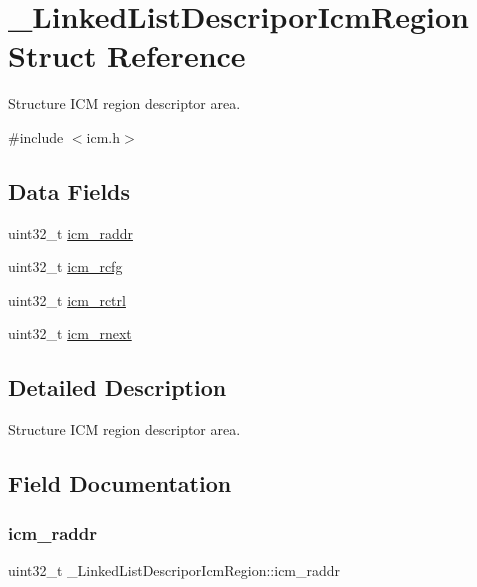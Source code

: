 \hypertarget{struct__LinkedListDescriporIcmRegion}{}\section{\+\_\+\+Linked\+List\+Descripor\+Icm\+Region Struct Reference}
\label{struct__LinkedListDescriporIcmRegion}


Structure I\+CM region descriptor area.  




{\ttfamily \#include $<$icm.\+h$>$}

\subsection*{Data Fields}
\begin{DoxyCompactItemize}
\item 
uint32\+\_\+t \mbox{\hyperlink{struct__LinkedListDescriporIcmRegion_a00caf8a36933079117e008146cad1712}{icm\+\_\+raddr}}
\item 
uint32\+\_\+t \mbox{\hyperlink{struct__LinkedListDescriporIcmRegion_a5b5bcef3f4fd257322d694648096ee69}{icm\+\_\+rcfg}}
\item 
uint32\+\_\+t \mbox{\hyperlink{struct__LinkedListDescriporIcmRegion_a838bcfa002525b1e5f64966faf30dac0}{icm\+\_\+rctrl}}
\item 
uint32\+\_\+t \mbox{\hyperlink{struct__LinkedListDescriporIcmRegion_a91c8e9c36f90b51ab714cc686886ef31}{icm\+\_\+rnext}}
\end{DoxyCompactItemize}


\subsection{Detailed Description}
Structure I\+CM region descriptor area. 

\subsection{Field Documentation}
\mbox{\label{struct__LinkedListDescriporIcmRegion_a00caf8a36933079117e008146cad1712}} 
\subsubsection{\texorpdfstring{icm\_raddr}{icm\_raddr}}
{\footnotesize\ttfamily uint32\+\_\+t \+\_\+\+Linked\+List\+Descripor\+Icm\+Region\+::icm\+\_\+raddr}

